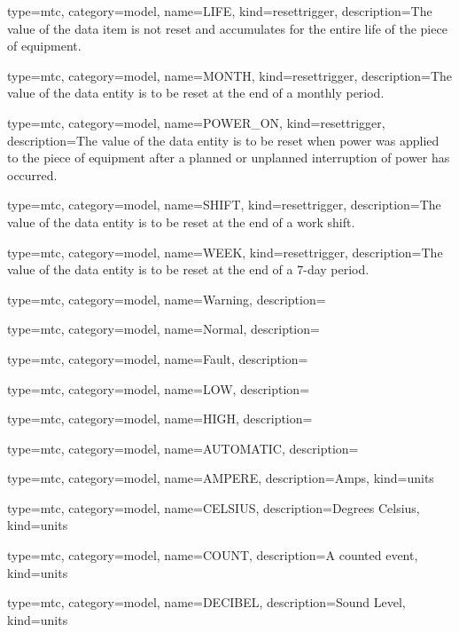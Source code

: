 {
  type=mtc,
  category=model,
  name={LIFE},
  kind={resettrigger},
  description={The value of the data item is not reset and accumulates for the entire life of the piece of equipment.}
}


{
  type=mtc,
  category=model,
  name={MONTH},
  kind={resettrigger},
  description={The value of the \gls{data entity} is to be reset at the end of a monthly period.}
}


{
  type=mtc,
  category=model,
  name={POWER\_ON},
  kind={resettrigger},
  description={The value of the \gls{data entity} is to be reset when power was applied to the piece of equipment after a planned or unplanned interruption of power has occurred.}
}


{
  type=mtc,
  category=model,
  name={SHIFT},
  kind={resettrigger},
  description={The value of the \gls{data entity} is to be reset at the end of a work shift.}
}


{
  type=mtc,
  category=model,
  name={WEEK},
  kind={resettrigger},
  description={The value of the \gls{data entity} is to be reset at the end of a 7-day period.}
}


{
  type=mtc,
  category=model,
  name={Warning},
  description={}
}


{
  type=mtc,
  category=model,
  name={Normal},
  description={}
}


{
  type=mtc,
  category=model,
  name={Fault},
  description={}
}


{
  type=mtc,
  category=model,
  name={LOW},
  description={}
}


{
  type=mtc,
  category=model,
  name={HIGH},
  description={}
}


{
  type=mtc,
  category=model,
  name={AUTOMATIC},
  description={}
}


{
  type=mtc,
  category=model,
  name={AMPERE},
  description={Amps},
  kind={units}
}


{
  type=mtc,
  category=model,
  name={CELSIUS},
  description={Degrees Celsius},
  kind={units}
}


{
  type=mtc,
  category=model,
  name={COUNT},
  description={A counted event},
  kind={units}
}


{
  type=mtc,
  category=model,
  name={DECIBEL},
  description={Sound Level},
  kind={units}
}


